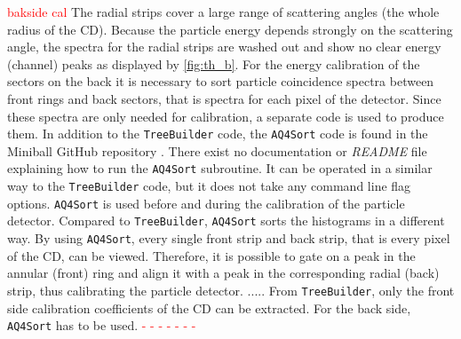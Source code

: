 \documentclass[twoside,english]{uiofysmaster/uiofysmaster}
\let\orgautoref\autoref
\renewcommand{\autoref}
        {%
		 \def\sectionautorefname{Section}%
		 \def\subsectionautorefname{Section}%
		 \def\subsubsectionautorefname{Section}%
		 \def\chapterautorefname{Chapter}%
          \orgautoref}
\begin{document}
\bigskip


\textcolor{red}{bakside cal}\newline
The radial strips cover a large range of scattering angles (the whole radius of the CD). 
Because the particle energy depends strongly on the scattering angle, the spectra for the radial strips are washed out and show no clear energy (channel) peaks as displayed by \autoref{fig:th_b}.
For the energy calibration of the sectors on the back it is necessary to sort particle coincidence spectra between front rings and back sectors, that is spectra for each pixel of the detector.
Since these spectra are only needed for calibration, a separate code is used to produce them.
In addition to the \texttt{TreeBuilder} code, the \texttt{AQ4Sort} code is found in the Miniball GitHub repository \cite{MBCS}.
There exist no documentation or \textit{README} file explaining how to run the \texttt{AQ4Sort} subroutine. 
It can be operated in a similar way to the \texttt{TreeBuilder} code, but it does not take any command line flag options.
\texttt{AQ4Sort} is used before and during the calibration of the particle detector.
Compared to \texttt{TreeBuilder}, \texttt{AQ4Sort} sorts the histograms in a different way.
By using \texttt{AQ4Sort}, every single front strip and back strip, that is every pixel of the CD, can be viewed. 
Therefore, it is possible to gate on a peak in the annular (front) ring and align it with a peak in the corresponding radial (back) strip, thus calibrating the particle detector. 
\newline ..... From \texttt{TreeBuilder}, only the front side calibration coefficients of the CD can be extracted. 
For the back side, \texttt{AQ4Sort} has to be used.
\newline\textcolor{red}{- - - - - - -}
\end{document}
